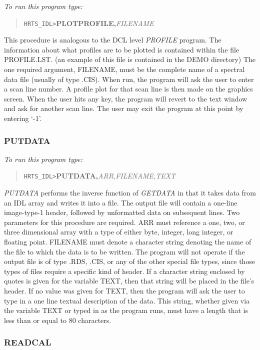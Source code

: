 {\em To run this program type:}
\begin{quote}
{\tt HRTS\_IDL>}{\bf PLOTPROFILE,}{\it FILENAME}
\end{quote}
   This procedure is analogous to the DCL level {\em PROFILE} program.  The
   information about what profiles are to be plotted is contained within
   the file PROFILE.LST. (an example of this file is contained in
   the DEMO directory)
   The one required argument, FILENAME, must be the complete name of a
   spectral data file (usually of type .CIS).  When run, the program will
   ask the user to enter a scan line number.  A profile plot for that scan
   line is then made on the graphics screen.  When the user hits any key,
   the program will revert to the text window and ask for another scan
   line.  The user may exit the program at this point by entering `-1'.

\subsubsection{PUTDATA}

{\em To run this program type:}
\begin{quote}
{\tt HRTS\_IDL>}{\bf PUTDATA,}{\it ARR,FILENAME,TEXT}
\end{quote}
{\em PUTDATA} performs the inverse function of {\em GETDATA} in that it takes
   data from an IDL array and writes it into a file. The output file will
   contain a one-line image-type-1 header, followed by unformatted data on
   subsequent lines.  Two parameters for this procedure are required.  ARR
   must reference a one, two, or three dimensional array with a type of
   either byte, integer, long integer, or floating point.  FILENAME must
   denote a character string denoting the name of the file to which the
   data is to be written.  The program will not operate if the output file
   is of type .RDS, .CIS, or any of the other special file types, since
   those types of files require a specific kind of header.  If a character
   string enclosed by quotes is given for the variable TEXT, then that
   string will be placed in the file's header.  If no value was given for
   TEXT, then the program will ask the user to type in a one line textual
   description of the data.  This string, whether given via the variable
   TEXT or typed in as the program runs, must have a length that is less
   than or equal to 80 characters.

\subsubsection{READCAL}

